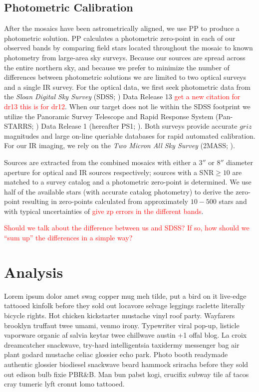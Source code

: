 \documentclass[apj, revtex4]{emulateapj}
\newcommand{\editorial}[1]{\textcolor{red}{#1}}
\begin{document}
\subsection{Photometric Calibration}
After the mosaics have been astrometrically aligned, we use PP to produce a photometric solution. PP calculates a photometric zero-point in each of our observed bands by comparing field stars located throughout the mosaic to known photometry from large-area sky surveys. Because our sources are spread across the entire northern sky, and because we prefer to minimize the number of differences between photometric solutions we are limited to two optical surveys and a single IR survey. For the optical data, we first seek photometric data from the \textit{Sloan Digital Sky Survey} (SDSS; \citealt{York2000}) Data Release 13 \citep{Alam2015} \editorial{get a new citation for dr13 this is for dr12}. When our target does not lie within the SDSS footprint we utilize the Panoramic Survey Telescope and Rapid Response System (Pan-STARRS; \citealt{Chambers2016}) Data Release 1 (hereafter PS1; \citealt{Flewelling2016}). Both surveys provide accurate $griz$ magnitudes and large on-line queriable databases for rapid automated calibration. For our IR imaging, we rely on the \textit{Two Micron All Sky Survey} (2MASS; \citealt{Skrutskie2006}).

Sources are extracted from the combined mosaics with either a $3''$ or $8''$ diameter aperture for optical and IR sources respectively; sources with a SNR$\ge10$ are matched to a survey catalog and a photometric zero-point is determined. We use half of the available stars (with accurate catalog photometry) to derive the zero-point resulting in zero-points calculated from approximately $10-500$ stars and with typical uncertainties of \editorial{give zp errors in the different bands}.

\editorial{Should we talk about the difference between us and SDSS? If so, how should we ``sum up'' the differences in a simple way?} 

\section{Analysis}\label{sec:analysis}
Lorem ipsum dolor amet swag copper mug meh tilde, put a bird on it live-edge tattooed kinfolk before they sold out locavore selvage leggings raclette literally bicycle rights. Hot chicken kickstarter mustache vinyl roof party. Wayfarers brooklyn truffaut twee umami, venmo irony. Typewriter viral pop-up, listicle vaporware organic af salvia keytar twee chillwave austin +1 offal blog. La croix dreamcatcher snackwave, try-hard intelligentsia taxidermy messenger bag air plant godard mustache celiac glossier echo park. Photo booth readymade authentic glossier biodiesel snackwave beard hammock sriracha before they sold out edison bulb fixie PBR\&B. Man bun pabst kogi, crucifix subway tile af tacos cray tumeric lyft cronut lomo tattooed.
\end{document}

